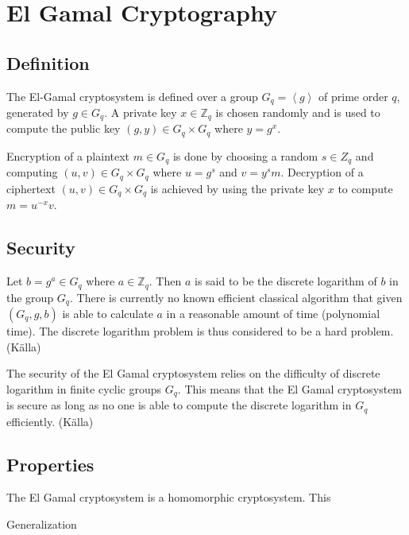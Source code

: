 \section{El Gamal Cryptography}

\subsection{Definition}
The El-Gamal cryptosystem is defined over a group $G_q =
\left<g\right>$ of prime order $q$, generated by $g \in G_q$. A
private key $x \in \mathbb{Z}_q$ is chosen randomly and is used to
compute the public key $(g,y) \in G_q \times G_q$ where $y =
g^x$. 

Encryption of a plaintext $m \in G_q$ is done by choosing a random $s
\in Z_q$ and computing $(u,v) \in G_q \times G_q$ where $u = g^s$ and
$v = y^sm$. Decryption of a ciphertext $(u,v) \in G_q \times G_q$ is
achieved by using the private key $x$ to compute $m = u^{-x}v$.

\subsection{Security}
Let $b = g^a \in G_q$ where $a \in \mathbb{Z}_q$. Then $a$ is said to
be the discrete logarithm of $b$ in the group $G_q$. There is
currently no known efficient classical algorithm that given $(G_q, g,
b)$ is able to calculate $a$ in a reasonable amount of time
(polynomial time). The discrete logarithm problem is thus considered
to be a hard problem. (Källa)

The security of the El Gamal cryptosystem relies on the difficulty of
discrete logarithm in finite cyclic groups $G_q$. This means that the
El Gamal cryptosystem is secure as long as no one is able to compute
the discrete logarithm in $G_q$ efficiently. (Källa)

\subsection{Properties}
The El Gamal cryptosystem is a homomorphic cryptosystem. This 




Generalization
